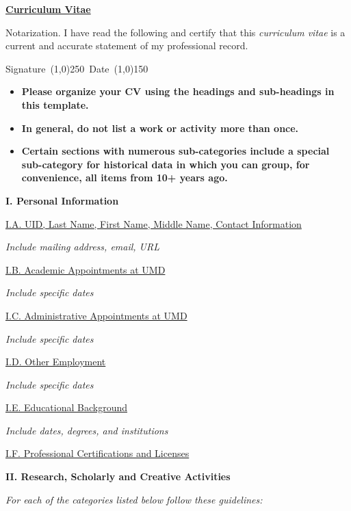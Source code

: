 \documentclass[11pt,letterpaper]{article}
\begin{document}
\centerline{\underline{\textbf{Curriculum Vitae}}}
\noindent Notarization.   I have read the following and certify that this \textit{curriculum vitae} is a current and accurate statement of my professional record.


Signature\ \line(1,0){250}\ Date\ \line(1,0){150}

\begin{itemize}\itemsep0em
\item \textbf{Please organize your CV using the headings and sub-headings in this template.}
\item \textbf{In general, do not list a work or activity more than once.}
\item \textbf{Certain sections with numerous sub-categories include a special sub-category for historical data in which you can group, for convenience, all items from 10+ years ago.}
\end{itemize}
\textbf{I. Personal Information}


\underline{I.A. UID, Last Name, First Name, Middle Name, Contact Information}

\textit{Include mailing address, email, URL}


\underline{I.B. Academic Appointments at UMD}

\textit{Include specific dates}


\underline{I.C. Administrative Appointments at UMD}

\textit{Include specific dates}


\underline{I.D. Other Employment}

\textit{Include specific dates}


\underline{I.E. Educational Background}

\textit{Include dates, degrees, and institutions}


\underline{I.F. Professional Certifications and Licenses}


\textbf{II. Research, Scholarly and Creative Activities}

\textit{For each of the categories listed below follow these guidelines:}
\end{document}
